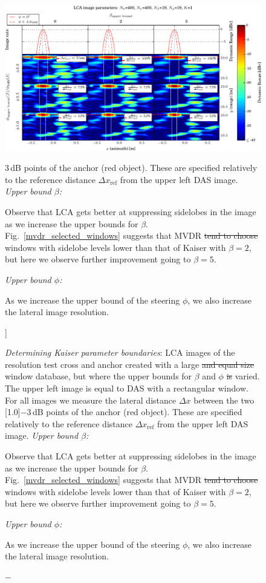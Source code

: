\documentclass[10pt,journal,draftclsnofoot,onecolumn]{IEEEtran}
\let\MYoriglatexcaption\caption               %
\renewcommand{\caption}[2][\relax]{\MYoriglatexcaption[#2]{#2}}
\newcommand\Fig[1]{Fig.~\ref{#1}}
\newcommand\1{\vec 1}
\newcommand\minus{\scalebox{0.75}[1.0]{$-$}}
\providecommand{\DIFadd}[1]{{\protect\color{blue}\uwave{#1}}} %
\providecommand{\DIFdel}[1]{{\protect\color{red}\sout{#1}}}                      %
\providecommand{\DIFaddFL}[1]{\DIFadd{#1}} %
\providecommand{\DIFdelFL}[1]{\DIFdel{#1}} %
\providecommand{\DIFaddbeginFL}{} %
\providecommand{\DIFaddendFL}{} %
\providecommand{\DIFdelbeginFL}{} %
\providecommand{\DIFdelendFL}{} %
\begin{document}
\begin{figure}[t]%
\includegraphics[width=\textwidth]{gfx/buske4_online.pdf}%
\caption{\emph{Determining Kaiser parameter boundaries}: LCA images of the resolution test cross and anchor created with a large \DIFdelbeginFL \DIFdelFL{and equal size }\DIFdelendFL window database, but where the upper bounds for $\beta$ and $\phi$ \DIFdelbeginFL \DIFdelFL{is }\DIFdelendFL \DIFaddbeginFL \DIFaddFL{are }\DIFaddendFL varied. The upper left image is equal to DAS with a rectangular window. For all images we measure the lateral distance $\Delta x$ between the two \protect\minus{}3\,dB points of the anchor (red object). These are specified relatively to the reference distance  $\Delta x_\text{ref}$ from the upper left DAS image.
\newline
\emph{Upper bound $\beta$:}\hfill
\parbox[t]{.89\linewidth}{Observe that LCA gets better at suppressing sidelobes in the image as we increase the upper bounds for $\beta$. \Fig{mvdr_selected_windows} suggests that MVDR \DIFdelFL{tend to choose}\DIFaddFL{prefers} windows with sidelobe levels lower than that of Kaiser with $\beta=2$, but here we observe further improvement going to $\beta=5$.} \newline
\emph{Upper bound $\phi$:}\hfill
\parbox[t]{.89\linewidth}{As we increase the upper bound of the steering $\phi$, we also increase the lateral image resolution. }
}\label{oversampling_mosaic_bounds}
\end{figure}

\end{document}
